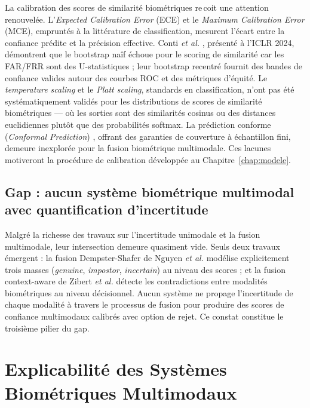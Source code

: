 \documentclass[12pt,a4paper]{report}
\begin{document}
La calibration des scores de similarit\'{e} biom\'{e}triques re\,{c}oit une attention renouvel\'{e}e. L'\textit{Expected Calibration Error} (ECE) et le \textit{Maximum Calibration Error} (MCE), emprunt\'{e}s \`{a} la litt\'{e}rature de classification, mesurent l'\'{e}cart entre la confiance pr\'{e}dite et la pr\'{e}cision effective. Conti \textit{et al.} \cite{conti2024assessing}, pr\'{e}sent\'{e} \`{a} l'ICLR 2024, d\'{e}montrent que le bootstrap na\^{i}f \'{e}choue pour le scoring de similarit\'{e} car les FAR/FRR sont des U-statistiques ; leur bootstrap recentr\'{e} fournit des bandes de confiance valides autour des courbes ROC et des m\'{e}triques d'\'{e}quit\'{e}. Le \textit{temperature scaling} et le \textit{Platt scaling}, standards en classification, n'ont pas \'{e}t\'{e} syst\'{e}matiquement valid\'{e}s pour les distributions de scores de similarit\'{e} biom\'{e}triques --- o\`{u} les sorties sont des similarit\'{e}s cosinus ou des distances euclidiennes plut\^{o}t que des probabilit\'{e}s softmax. La pr\'{e}diction conforme (\textit{Conformal Prediction}) \cite{balomenos2018automatic}, offrant des garanties de couverture \`{a} \'{e}chantillon fini, demeure inexplor\'{e}e pour la fusion biom\'{e}trique multimodale. Ces lacunes motiveront la proc\'{e}dure de calibration d\'{e}velopp\'{e}e au Chapitre~\ref{chap:modele}.

\subsection{Gap : aucun syst\`{e}me biom\'{e}trique multimodal avec quantification d'incertitude}

Malgr\'{e} la richesse des travaux sur l'incertitude unimodale et la fusion multimodale, leur intersection demeure quasiment vide. Seuls deux travaux \'{e}mergent : la fusion Dempster-Shafer de Nguyen \textit{et al.} \cite{nguyen2015score} mod\'{e}lise explicitement trois masses (\textit{genuine}, \textit{impostor}, \textit{incertain}) au niveau des scores ; et la fusion context-aware de Zibert \textit{et al.} \cite{zibert2026context} d\'{e}tecte les contradictions entre modalit\'{e}s biom\'{e}triques au niveau d\'{e}cisionnel. Aucun syst\`{e}me ne propage l'incertitude de chaque modalit\'{e} \`{a} travers le processus de fusion pour produire des scores de confiance multimodaux calibr\'{e}s avec option de rejet. Ce constat constitue le troisi\`{e}me pilier du gap.

\section{Explicabilit\'{e} des Syst\`{e}mes Biom\'{e}triques Multimodaux}
\label{sec:explicabilite}
\end{document}
